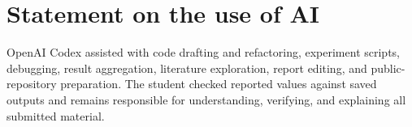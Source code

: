 \documentclass{article}
\begin{document}
\section{Statement on the use of AI}

OpenAI Codex assisted with code drafting and refactoring, experiment scripts, debugging, result aggregation, literature exploration, report editing, and public-repository preparation. The student checked reported values against saved outputs and remains responsible for understanding, verifying, and explaining all submitted material.



\end{document}
